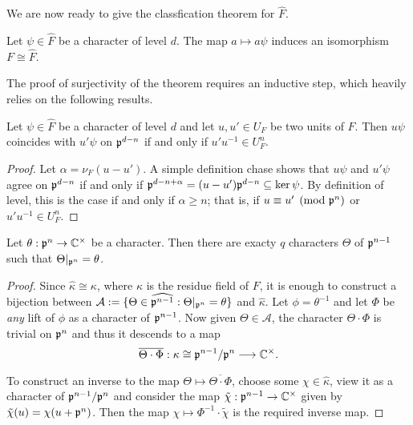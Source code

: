 We are now ready to give the classfication theorem for $\hat{F}$.

\begin{thm}\label{add_dual}
    Let $\psi\in\hat{F}$ be a character of level $d$. The map $a\mapsto a\psi$ induces an isomorphism $F\cong\hat{F}$. 
\end{thm}

The proof of surjectivity of the theorem requires an inductive step, which heavily relies on the following results.

\begin{lemma}\label{lem_congruence}
    Let $\psi\in\hat{F}$ be a character of level $d$ and let $u,u'\in U_F$ be two units of $F$. Then $u\psi$ coincides with $u'\psi$ on $\mathfrak{p}^{d-n}$ if and only if $u'u^{-1}\in U_F^{n}$.
\end{lemma}
\begin{proof}
    Let $\alpha=\nu_F(u-u')$. A simple definition chase shows that $u\psi$ and $u'\psi$ agree on $\mathfrak{p}^{d-n}$ if and only if $\mathfrak{p}^{d-n+\alpha}=(u-u')\mathfrak{p}^{d-n}\subseteq\ker\psi$. By definition of level, this is the case if and only if $\alpha\geq n$; that is, if $u\equiv u'\pmod{\mathfrak{p}^n}$ or $u'u^{-1}\in U_F^{n}$.
\end{proof}

\begin{lemma}\label{lem_chars}
    Let $\theta:\mathfrak{p}^{n}\rightarrow\mathbb{C}^{\times}$ be a character. Then there are exacty $q$ characters $\Theta$ of $\mathfrak{p}^{n-1}$ such that $\Theta|_{\mathfrak{p}^n}=\theta$.
\end{lemma}

\begin{proof}
    Since $\hat\kappa\cong\kappa$, where $\kappa$ is the residue field of $F$, it is enough to construct a bijection between $\mathcal{A}:=\{\Theta\in\widehat{\mathfrak{p}^{n-1}}:\Theta|_{\mathfrak{p}^n}=\theta\}$ and $\hat{\kappa}$. Let $\phi=\theta^{-1}$ and let $\Phi$ be \textit{any} lift of $\phi$ as a character of $\mathfrak{p}^{n-1}$. Now given $\Theta\in\mathcal{A}$, the character $\Theta\cdot\Phi$ is trivial on $\mathfrak{p}^{n}$ and thus it descends to a map 
    $$\overline{\Theta\cdot\Phi}:\kappa\cong\mathfrak{p}^{n-1}/\mathfrak{p}^n\longrightarrow\mathbb{C}^{\times}.$$

    To construct an inverse to the map $\Theta\mapsto\overline{\Theta\cdot\Phi}$, choose some $\chi\in\hat\kappa$, view it as a character of $\mathfrak{p}^{n-1}/\mathfrak{p}^{n}$ and consider the map $\tilde\chi:\mathfrak{p}^{n-1}\rightarrow\mathbb{C}^{\times}$ given by $\tilde{\chi}(u)=\chi(u+\mathfrak{p}^n)$. Then the map $\chi\mapsto\Phi^{-1}\cdot\tilde\chi$ is the required inverse map.
\end{proof}

